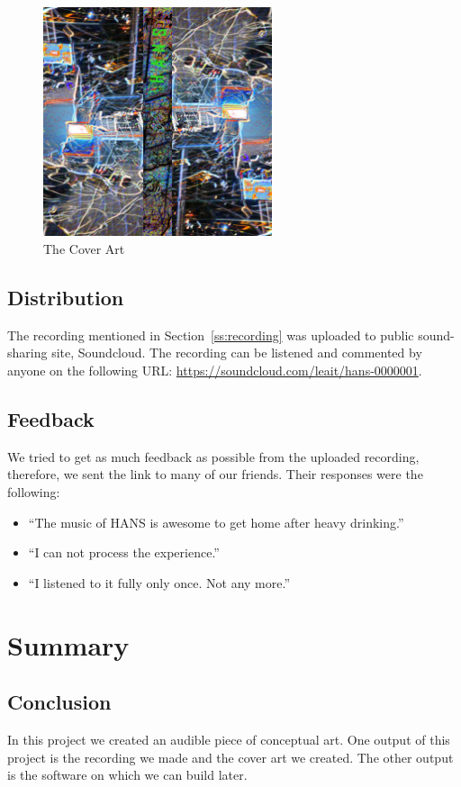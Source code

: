 \documentclass[12pt,a4paper,oneside]{report}
\begin{document}
\begin{figure}[h!]
\centering
\includegraphics[width=0.6\textwidth]{hans_neon_1x2.jpg}
\caption{The Cover Art}
\label{fig:cover_art}
\end{figure}

\subsection*{Distribution}
The recording mentioned in Section~\ref{ss:recording} was uploaded to
public sound-sharing site, Soundcloud. The recording can be listened
and commented by anyone on the following URL:
\url{https://soundcloud.com/leait/hans-0000001}.

\subsection*{Feedback}
We tried to get as much feedback as possible from the uploaded
recording, therefore, we sent the link to many of our friends.  Their
responses were the following:

\begin{itemize}
\item ``The music of HANS is awesome to get home after heavy drinking.''
\item ``I can not process the experience.''
\item ``I listened to it fully only once. Not any more.''
\end{itemize}

\section*{Summary}
\subsection*{Conclusion}
In this project we created an audible piece of conceptual art. One
output of this project is the recording we made and the cover art we
created. The other output is the software on which we can build later.
\end{document}
